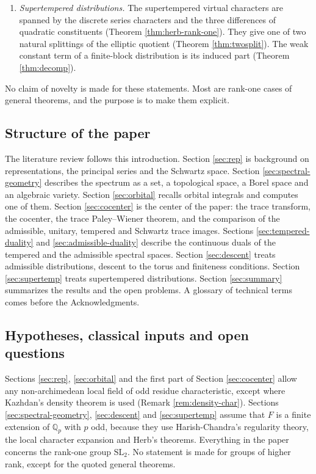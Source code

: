 \documentclass[12pt,letterpaper]{amsart}
\numberwithin{equation}{section}
\theoremstyle{definition}
\theoremstyle{remark}
\begin{document}
\begin{enumerate}[label=\arabic*.,leftmargin=*]
\item \emph{Supertempered distributions.} The supertempered virtual characters are spanned by the discrete series characters and the three differences of quadratic constituents (Theorem \ref{thm:herb-rank-one}). They give one of two natural splittings of the elliptic quotient (Theorem \ref{thm:twosplit}). The weak constant term of a finite-block distribution is its induced part (Theorem \ref{thm:decomp}).
\end{enumerate}
No claim of novelty is made for these statements. Most are rank-one cases of general theorems, and the purpose is to make them explicit.

\subsection{Structure of the paper}\label{sec:structure}
The literature review follows this introduction. Section \ref{sec:rep} is background on representations, the principal series and the Schwartz space. Section \ref{sec:spectral-geometry} describes the spectrum as a set, a topological space, a Borel space and an algebraic variety. Section \ref{sec:orbital} recalls orbital integrals and computes one of them. Section \ref{sec:cocenter} is the center of the paper: the trace transform, the cocenter, the trace Paley--Wiener theorem, and the comparison of the admissible, unitary, tempered and Schwartz trace images. Sections \ref{sec:tempered-duality} and \ref{sec:admissible-duality} describe the continuous duals of the tempered and the admissible spectral spaces. Section \ref{sec:descent} treats admissible distributions, descent to the torus and finiteness conditions. Section \ref{sec:supertemp} treats supertempered distributions. Section \ref{sec:summary} summarizes the results and the open problems. A glossary of technical terms comes before the Acknowledgments.

\subsection{Hypotheses, classical inputs and open questions}\label{sec:status}
Sections \ref{sec:rep}, \ref{sec:orbital} and the first part of Section \ref{sec:cocenter} allow any non-archimedean local field of odd residue characteristic, except where Kazhdan's density theorem is used (Remark \ref{rem:density-char}). Sections \ref{sec:spectral-geometry}, \ref{sec:descent} and \ref{sec:supertemp} assume that $F$ is a finite extension of $\mathbb Q_p$ with $p$ odd, because they use Harish-Chandra's regularity theory, the local character expansion and Herb's theorems. Everything in the paper concerns the rank-one group $\mathrm{SL}_2$. No statement is made for groups of higher rank, except for the quoted general theorems.
\end{document}
